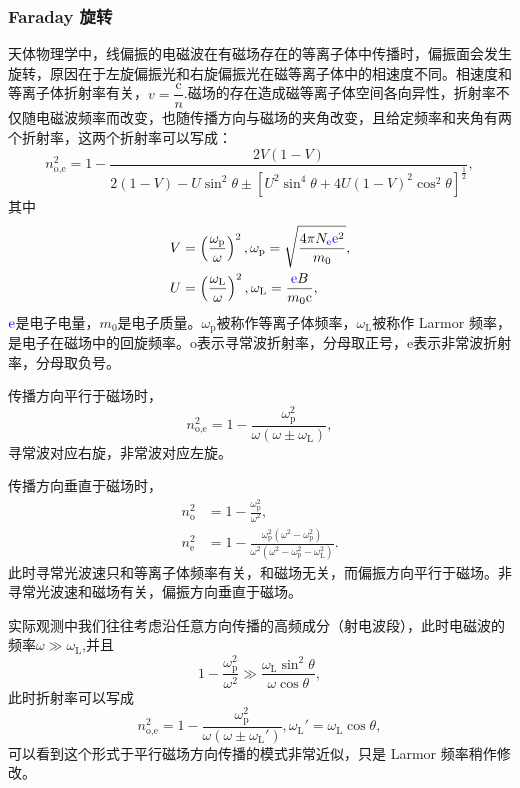 \documentclass[../天体物理基础.tex]{subfiles}
\begin{document}
\subsubsection{Faraday 旋转}
天体物理学中，线偏振的电磁波在有磁场存在的等离子体中传播时，偏振面会发生旋转，原因在于左旋偏振光和右旋偏振光在磁等离子体中的相速度不同。相速度和等离子体折射率有关，$v=\dfrac{\mathrm{c}}{n}$.磁场的存在造成磁等离子体空间各向异性，折射率不仅随电磁波频率而改变，也随传播方向与磁场的夹角改变，且给定频率和夹角有两个折射率，这两个折射率可以写成：
\begin{equation}
n^{2}_{\text{o,e}}=1-\frac{2V\left(1-V\right)}{2\left(1-V\right)-U\sin^{2}\theta\pm\left[U^{2}\sin^{4}\theta+4U\left(1-V\right)^{2}\cos^{2}\theta\right]^{\frac{1}{2}}},
\end{equation}
其中
\begin{align}
V&=\left(\frac{\omega_{\text{p}}}{\omega}\right)^{2},\omega_{\text{p}}=\sqrt{\frac{4\pi N_{{\color{blue}{\ce{e}}}}{\color{blue}{\ce{e}}}^{2}}{m_{0}}},\\
U&=\left(\frac{\omega_{\text{L}}}{\omega}\right)^{2},\omega_{\text{L}}=\frac{{\color{blue}{\ce{e}}}B}{m_{0}\mathrm{c}},
\end{align}
${\color{blue}{\ce{e}}}$是电子电量，$m_{0}$是电子质量。$\omega_{\text{p}}$被称作等离子体频率，$\omega_{\text{L}}$被称作 Larmor 频率，是电子在磁场中的回旋频率。$\text{o}$表示寻常波折射率，分母取正号，$\text{e}$表示非常波折射率，分母取负号。

传播方向平行于磁场时，
\begin{equation}
n_{\text{o,e}}^{2}=1-\frac{\omega_{\text{p}}^{2}}{\omega\left(\omega\pm\omega_{\text{L}}\right)},
\end{equation}
寻常波对应右旋，非常波对应左旋。

传播方向垂直于磁场时，
\begin{align}
n_{\text{o}}^{2}&=1-\frac{\omega^{2}_{\text{p}}}{\omega^{2}},\\
n_{\text{e}}^{2}&=1-\frac{\omega_{\text{p}}^{2}\left(\omega^{2}-\omega_{\text{p}}^{2}\right)}{\omega^{2}\left(\omega^{2}-\omega_{\text{p}}^{2}-\omega_{\text{L}}^{2}\right)}.
\end{align}
此时寻常光波速只和等离子体频率有关，和磁场无关，而偏振方向平行于磁场。非寻常光波速和磁场有关，偏振方向垂直于磁场。

实际观测中我们往往考虑沿任意方向传播的高频成分（射电波段），此时电磁波的频率$\omega\gg\omega_{\text{L}}$,并且
\begin{equation}
1-\frac{\omega_{\text{p}}^{2}}{\omega^{2}}\gg\frac{\omega_{\text{L}}\sin^{2}\theta}{\omega\cos\theta},
\end{equation}
此时折射率可以写成
\begin{equation}
n^{2}_{\text{o,e}}=1-\frac{\omega_{\text{p}}^{2}}{\omega\left(\omega\pm\omega_{\text{L}}'\right)},\omega_{\text{L}}'=\omega_{\text{L}}\cos\theta,\label{1.2.40}
\end{equation}
可以看到这个形式于平行磁场方向传播的模式非常近似，只是 Larmor 频率稍作修改。
\end{document}
